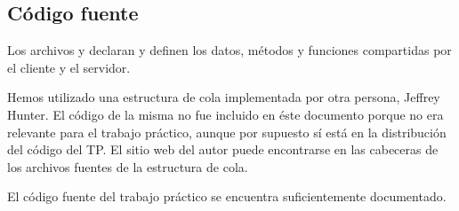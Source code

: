 \subsection{Código fuente}

Los archivos  y  declaran y definen los
datos, métodos y funciones compartidas por el cliente y el servidor.

Hemos utilizado una estructura de cola implementada por otra persona, Jeffrey
Hunter. El código de la misma no fue incluido en éste documento porque no era
relevante para el trabajo práctico, aunque por supuesto sí está en la
distribución del código del TP. El sitio web del autor puede encontrarse en las
cabeceras de los archivos fuentes de la estructura de cola.

El código fuente del trabajo práctico se encuentra suficientemente documentado.






